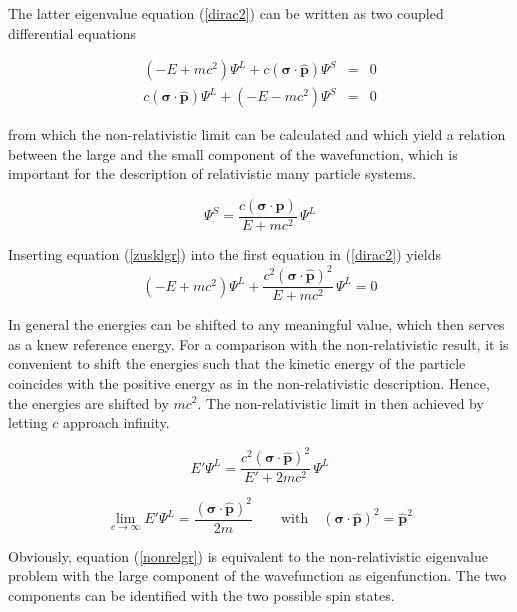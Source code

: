 The latter eigenvalue equation (\ref{dirac2}) can be written as two coupled
differential equations

\begin{equation}\begin{array}{rcl}
(-E+mc^2)\Psi^L + c(\mathbf{\sigma}\cdot\hat{\mathbf{p}}) \Psi^S &=& 0\\
c(\mathbf{\sigma}\cdot\hat{\mathbf{p}}) \Psi^L +(-E-mc^2)\Psi^S &=& 0
\end{array}\end{equation}

from which the non-relativistic limit can be calculated and which
yield a relation between the large and the small component of the
wavefunction, which is important for the description of relativistic
many particle systems.

\begin{equation}\label{zusklgr}
\Psi^S = \frac{c(\mathbf{\sigma}\cdot\hat{\mathbf{p}})}{E+mc^2}\,\Psi^L
\end{equation}

Inserting equation (\ref{zusklgr}) into the first equation in (\ref{dirac2})
yields
\begin{equation}
(-E+mc^2)\Psi^L + \frac{c^2(\mathbf{\sigma}\cdot\hat{\mathbf{p}})^2}{E+mc^2}\,\Psi^L = 0
\end{equation}

In general the energies can be shifted to any meaningful value, which then
serves as a knew reference energy. For a comparison with the non-relativistic result,
it is convenient to shift the energies such
that the kinetic energy of the particle coincides with the positive energy as
in the non-relativistic description. Hence, the energies are shifted by $mc^2$.
The non-relativistic limit in then achieved by letting $c$ approach infinity.

\begin{equation}
E'\Psi^L = \frac{c^2(\mathbf{\sigma}\cdot\hat{\mathbf{p}})^2}{E'+2mc^2}\,\Psi^L\label{hamneu}
\end{equation}

\begin{equation}
\lim_{c\rightarrow\infty} E'\Psi^L = \frac{(\mathbf{\sigma}\cdot\hat{\mathbf{p}})^2}{2m} \qquad\text{with}\quad (\mathbf{\sigma}\cdot\hat{\mathbf{p}})^2=\hat{\mathbf{p}}^2\label{nonrelgr}
\end{equation}

Obviously, equation (\ref{nonrelgr}) is equivalent to the non-relativistic
eigenvalue problem with the large component of the wavefunction as eigenfunction.
The two components can be identified with the two possible spin states.

